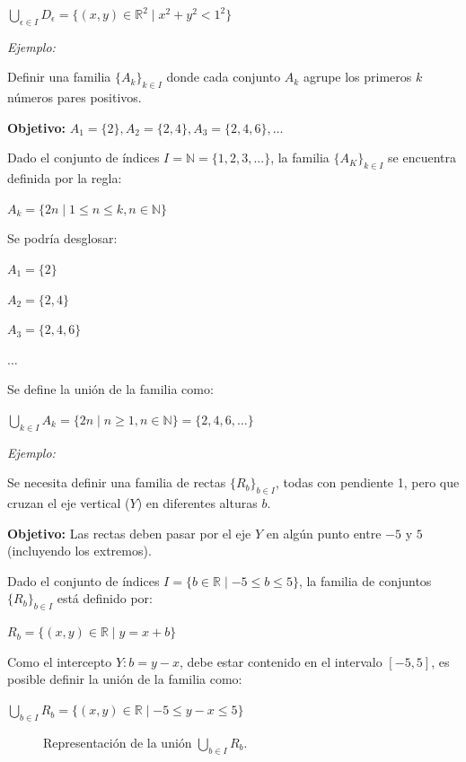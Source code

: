 \documentclass{article}
\begin{document}
$\bigcup_{\epsilon \in I} D_{\epsilon} = \{(x, y) \in \mathbb{R}^2 \mid x^2 + y^2 < 1^2\}$

\newpage
\textit{Ejemplo:}

Definir una familia $\{A_k\}_{k \in I}$ donde cada conjunto $A_k$ agrupe los primeros $k$ números pares positivos.

\textbf{Objetivo:} $A_1 = \{2\}, A_2 = \{2, 4\}, A_3 = \{2, 4, 6\}, \dots$

Dado el conjunto de índices $I = \mathbb{N} = \{1, 2, 3, ...\}$, la familia $\{A_K\}_{k \in I}$ se encuentra definida por la regla:

$A_k = \{2n \mid 1 \le n \le k, n \in \mathbb{N}\}$

Se podría desglosar:

$A_1 = \{2\}$

$A_2 = \{2, 4\}$

$A_3 = \{2, 4, 6\}$

$\dots$

Se define la unión de la familia como:

$\bigcup_{k \in I} A_k = \{2n \mid n \ge 1, n \in \mathbb{N}\} = \{2, 4, 6, \dots\}$

\textit{Ejemplo:}

Se necesita definir una familia de rectas $\{R_b\}_{b \in I}$, todas con pendiente 1, pero que cruzan el eje vertical ($Y$) en diferentes alturas $b$.

\textbf{Objetivo:} Las rectas deben pasar por el eje $Y$ en algún punto entre $-5$ y $5$ (incluyendo los extremos).

Dado el conjunto de índices $I = \{b \in \mathbb{R} \mid -5 \le b \le 5\}$, la familia de conjuntos $\{R_b\}_{b \in I}$ está definido por:

$R_b = \{(x, y) \in \mathbb{R} \mid y = x + b\}$

Como el intercepto $Y: b = y - x$, debe estar contenido en el intervalo $\left[-5, 5\right]$, es posible definir la unión de la familia como:

$\bigcup_{b \in I} R_b = \{(x, y) \in \mathbb{R} \mid -5 \le y - x \le 5\}$

\begin{figure}[H]
\centering
{}
\caption{Representación de la unión $\bigcup_{b \in I} R_b$.}
\end{figure}
\end{document}
